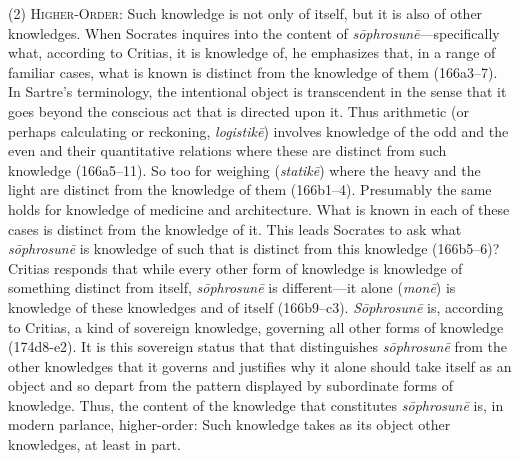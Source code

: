 (2) \textsc{Higher-Order}: Such knowledge is not only of itself, but it is also of other knowledges. When Socrates inquires into the content of \emph{sōphrosunē}—specifically what, according to Critias, it is knowledge of, he emphasizes that, in a range of familiar cases, what is known is distinct from the knowledge of them (166a3–7). In Sartre's terminology, the intentional object is transcendent in the sense that it goes beyond the conscious act that is directed upon it. Thus arithmetic (or perhaps calculating or reckoning, \emph{logistikē}) involves knowledge of the odd and the even and their quantitative relations where these are distinct from such knowledge (166a5–11). So too for weighing (\emph{statikē}) where the heavy and the light are distinct from the knowledge of them (166b1–4). Presumably the same holds for knowledge of medicine and architecture. What is known in each of these cases is distinct from the knowledge of it. This leads Socrates to ask what \emph{sōphrosunē} is knowledge of such that is distinct from this knowledge (166b5–6)? Critias responds that while every other form of knowledge is knowledge of something distinct from itself, \emph{sōphrosunē} is different—it alone (\emph{monē}) is knowledge of these knowledges and of itself (166b9–c3). \emph{Sōphrosunē} is, according to Critias, a kind of sovereign knowledge, governing all other forms of knowledge (174d8-e2). It is this sovereign status that that distinguishes \emph{sōphrosunē} from the other knowledges that it governs and justifies why it alone should take itself as an object and so depart from the pattern displayed by subordinate forms of knowledge. Thus, the content of the knowledge that constitutes \emph{sōphrosunē} is, in modern parlance, higher-order: Such knowledge takes as its object other knowledges, at least in part.

